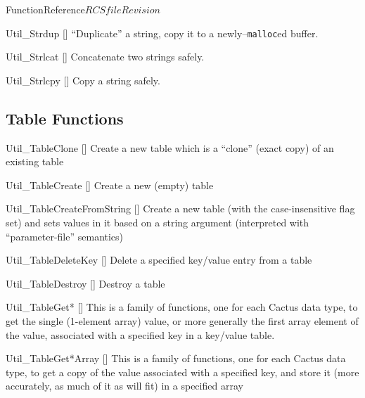 \begin{cactuspart}{FunctionReference}{$RCSfile$}{$Revision$}
\begin{Lentry}
\item[Util\_Strdup]
     [\pageref{Util-Strdup}]
``Duplicate'' a string,
\ie{} copy it to a newly--\verb|malloc|ed buffer.

\item[Util\_Strlcat]
     [\pageref{Util-Strlcat}]
Concatenate two strings safely.

\item[Util\_Strlcpy]
     [\pageref{Util-Strlcpy}]
Copy a string safely.

\end{Lentry}


\subsection{Table Functions}

\begin{Lentry}

\item[Util\_TableClone]
     [\pageref{Util-TableClone}]
Create a new table which is a ``clone'' (exact copy) of an existing
table

\item[Util\_TableCreate]
     [\pageref{Util-TableCreate}]
Create a new (empty) table

\item[Util\_TableCreateFromString]
     [\pageref{Util-TableCreateFromString}]
Create a new table (with the case-insensitive flag set) and sets
values in it based on a string argument (interpreted with
``parameter-file'' semantics)

\item[Util\_TableDeleteKey]
     [\pageref{Util-TableDeleteKey}]
Delete a specified key/value entry from a table

\item[Util\_TableDestroy]
     [\pageref{Util-TableDestroy}]
Destroy a table

\item[Util\_TableGet*]
     [\pageref{Util-TableGet*}]
This is a family of functions, one for each Cactus data type,
to get the single (1-element array) value, or more generally the
first array element of the value, associated with a specified key
in a key/value table.

\item[Util\_TableGet*Array]
     [\pageref{Util-TableGet*Array}]
This is a family of functions, one for each Cactus data type,
to get a copy of the value associated with a specified key, and store
it (more accurately, as much of it as will fit) in a specified array


\end{Lentry}
\end{cactuspart}
